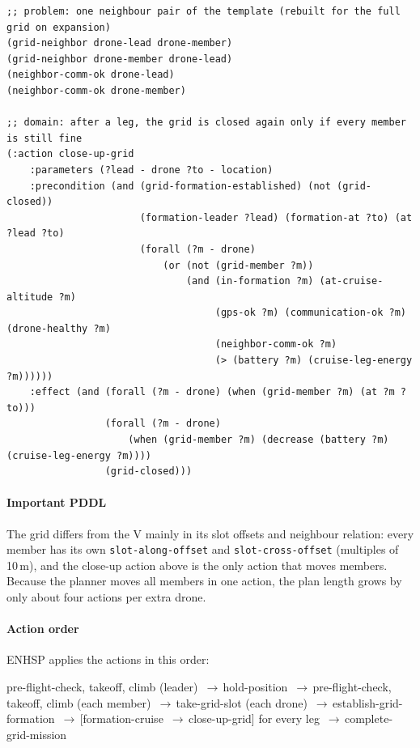 \documentclass[11pt,a4paper,oneside]{report}
\newcommand{\code}[1]{\texttt{#1}}
\newcommand{\then}{\,{\color{amber!80!black}$\boldsymbol{\rightarrow}$}\allowbreak\,}
\newcommand{\actionflow}[1]{%
  \par\begin{tcolorbox}[colback=codebg,colframe=coderule,boxrule=0.4pt,arc=2pt,
      left=5pt,right=5pt,top=2pt,bottom=2pt,before skip=6pt,after skip=8pt]
    \footnotesize\ttfamily\raggedright\setstretch{1.25}#1
  \end{tcolorbox}}
\begin{document}
\begin{lstlisting}
;; problem: one neighbour pair of the template (rebuilt for the full grid on expansion)
(grid-neighbor drone-lead drone-member)
(grid-neighbor drone-member drone-lead)
(neighbor-comm-ok drone-lead)
(neighbor-comm-ok drone-member)

;; domain: after a leg, the grid is closed again only if every member is still fine
(:action close-up-grid
    :parameters (?lead - drone ?to - location)
    :precondition (and (grid-formation-established) (not (grid-closed))
                       (formation-leader ?lead) (formation-at ?to) (at ?lead ?to)
                       (forall (?m - drone)
                           (or (not (grid-member ?m))
                               (and (in-formation ?m) (at-cruise-altitude ?m)
                                    (gps-ok ?m) (communication-ok ?m) (drone-healthy ?m)
                                    (neighbor-comm-ok ?m)
                                    (> (battery ?m) (cruise-leg-energy ?m))))))
    :effect (and (forall (?m - drone) (when (grid-member ?m) (at ?m ?to)))
                 (forall (?m - drone)
                     (when (grid-member ?m) (decrease (battery ?m) (cruise-leg-energy ?m))))
                 (grid-closed)))
\end{lstlisting}

\paragraph{Important PDDL}
The grid differs from the V mainly in its slot offsets and neighbour relation: every member has
its own \code{slot-along-offset} and \code{slot-cross-offset} (multiples of 10\,m), and the
close-up action above is the only action that moves members. Because the planner moves all
members in one action, the plan length grows by only about four actions per extra drone.

\paragraph{Action order} ENHSP applies the actions in this order:
\actionflow{pre-flight-check, takeoff, climb (leader) \then hold-position \then pre-flight-check,
takeoff, climb (each member) \then take-grid-slot (each drone) \then establish-grid-formation
\then [formation-cruise \then close-up-grid] for every leg \then complete-grid-mission}
\end{document}
